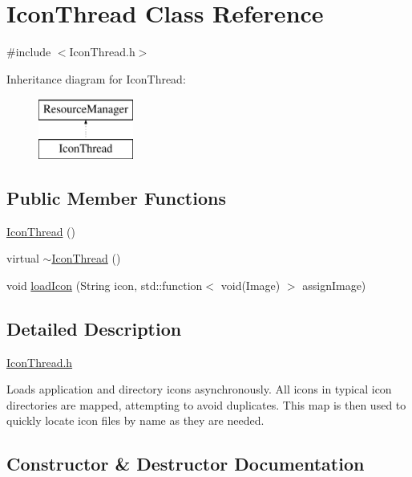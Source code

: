 \hypertarget{classIconThread}{}\section{Icon\+Thread Class Reference}
\label{classIconThread}


{\ttfamily \#include $<$Icon\+Thread.\+h$>$}

Inheritance diagram for Icon\+Thread\+:\begin{figure}[H]
\begin{center}
\leavevmode
\includegraphics[height=2.000000cm]{classIconThread}
\end{center}
\end{figure}
\subsection*{Public Member Functions}
\begin{DoxyCompactItemize}
\item 
\mbox{\hyperlink{classIconThread_afb8624ebeb2b23499d7a3051a755f0f1}{Icon\+Thread}} ()
\item 
virtual \mbox{\hyperlink{classIconThread_abcbf5265504acb501d46f393bc421b0f}{$\sim$\+Icon\+Thread}} ()
\item 
void \mbox{\hyperlink{classIconThread_a508dad34417fb3767781191654fb7acb}{load\+Icon}} (String icon, std\+::function$<$ void(Image) $>$ assign\+Image)
\end{DoxyCompactItemize}


\subsection{Detailed Description}
\mbox{\hyperlink{IconThread_8h}{Icon\+Thread.\+h}}

Loads application and directory icons asynchronously. All icons in typical icon directories are mapped, attempting to avoid duplicates. This map is then used to quickly locate icon files by name as they are needed. 

\subsection{Constructor \& Destructor Documentation}
\mbox{\label{classIconThread_afb8624ebeb2b23499d7a3051a755f0f1}} 
